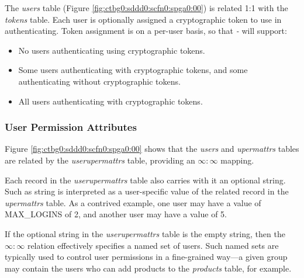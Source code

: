 The \emph{users} table 
(Figure \ref{fig:ctbg0:sddd0:scfn0:spga0:00}) is related 1:1 with the
\emph{tokens} table.
Each user is optionally assigned a cryptographic token to use in
authenticating.  Token assignment is on a per-user
basis, so that \emph{\productbasename{}-\productversion{}} will support:

\begin{itemize}
\item No users authenticating using cryptographic tokens.
\item Some users authenticating with cryptographic tokens, and some authenticating
      without cryptographic tokens.
\item All users authenticating with cryptographic tokens.
\end{itemize}


\subsubsection{User Permission Attributes}
\label{ctbg0:sddd0:scfn0:spga0}

Figure \ref{fig:ctbg0:sddd0:scfn0:spga0:00} shows that the \emph{users} and 
\emph{upermattrs} tables are related by the \emph{userupermattrs} table, providing 
an $\infty{}:\infty{}$ mapping.

Each record in the \emph{userupermattrs} table also carries with it an
optional string.  Such as string is interpreted as a user-specific value of the
related record in the \emph{upermattrs} table.  As a 
contrived example, one user may have
a value of MAX\_LOGINS of 2, and another user may have a value of 5.

If the optional string in the \emph{userupermattrs} table is the empty string,
then the $\infty{}:\infty{}$ relation effectively specifies a named set
of users.  Such named sets are typically used to control user permissions
in a fine-grained way---a given group may contain the users who can add
products to the \emph{products} table, for example.



